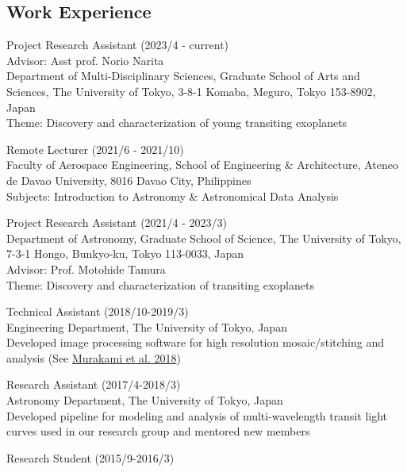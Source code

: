 \documentclass[11pt,letterpaper]{article}
\begin{document}
\subsection{Work Experience}
\begin{list}{}{\cvlist}
    \item
        Project Research Assistant (2023/4 - current) \\
        Advisor: Asst prof. Norio Narita \\
        Department of Multi-Disciplinary Sciences, Graduate School of Arts and Sciences, The University of Tokyo, 3-8-1 Komaba, Meguro, Tokyo 153-8902, Japan \\
        Theme: Discovery and characterization of young transiting exoplanets \\
    \item
        Remote Lecturer (2021/6 - 2021/10) \\
        Faculty of Aerospace Engineering, School of Engineering \& Architecture, Ateneo de Davao University, 8016 Davao City, Philippines \\
        Subjects: Introduction to Astronomy \& Astronomical Data Analysis \\
    \item
        Project Research Assistant (2021/4 - 2023/3) \\
        Department of Astronomy, Graduate School of Science, The University of Tokyo, 7-3-1 Hongo, Bunkyo-ku, Tokyo 113-0033, Japan \\
        Advisor: Prof. Motohide Tamura \\
        Theme: Discovery and characterization of transiting exoplanets \\
    \item 
        Technical Assistant (2018/10-2019/3)\\
        Engineering Department, The University of Tokyo, Japan\\
        Developed image processing software for high resolution mosaic/stitching and analysis (See \href{\spieurl}{Murakami et al. 2018})
    \item 
        Research Assistant (2017/4-2018/3)\\	
        Astronomy Department, The University of Tokyo, Japan\\
        Developed pipeline for modeling and analysis of multi-wavelength transit light curves used in our research group and mentored new members
    \item 
        Research Student (2015/9-2016/3)\\

\end{list}
\end{document}
